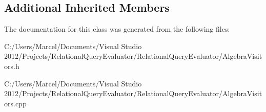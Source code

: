 \subsection*{Additional Inherited Members}


The documentation for this class was generated from the following files\+:\begin{DoxyCompactItemize}
\item 
C\+:/\+Users/\+Marcel/\+Documents/\+Visual Studio 2012/\+Projects/\+Relational\+Query\+Evaluator/\+Relational\+Query\+Evaluator/Algebra\+Visitors.\+h\item 
C\+:/\+Users/\+Marcel/\+Documents/\+Visual Studio 2012/\+Projects/\+Relational\+Query\+Evaluator/\+Relational\+Query\+Evaluator/Algebra\+Visitors.\+cpp\end{DoxyCompactItemize}
